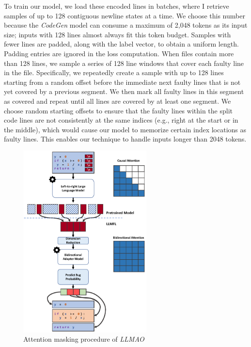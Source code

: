 \documentclass[12pt,openany,oneside,table]{cmuthesis}
\begin{document}
To train our model, we load these encoded lines in batches, where I retrieve samples of up to 128 contiguous newline states at a time. We choose this number because the \textit{CodeGen} model can consume a maximum of 2,048 tokens as its input size; inputs with 128 lines almost always fit this token budget. Samples with fewer lines are padded, along with the label vector, to obtain a uniform length. Padding entries are ignored in the loss computation. When files contain more than 128 lines, we sample a series of 128 line windows that cover each faulty line in the file. Specifically, we repeatedly create a sample with up to 128 lines starting from a random offset before the immediate next faulty lines that is not yet covered by a previous segment. We then mark all faulty lines in this segment as covered and repeat until all lines are covered by at least one segment. We choose random starting offsets to ensure that the faulty lines within the split code lines are not consistently at the same indices (e.g., right at the start or in the middle), which would cause our model to memorize certain index locations as faulty lines.  This enables our technique to handle inputs longer than 2048 tokens.


\begin{figure}[t]
\centering
\includegraphics[width=0.6\textwidth]{figures/approach/attention.pdf}
\caption{\small Attention masking procedure of \textit{LLMAO}}
\label{fig:attention}
\end{figure}
\end{document}
